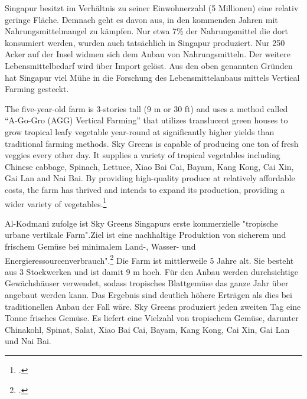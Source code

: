 \documentclass{scrartcl}
\begin{document}
Singapur besitzt im Verhältnis zu seiner Einwohnerzahl (5 Millionen)  eine relativ geringe Fläche. Demnach geht es davon aus, in den kommenden Jahren mit Nahrungsmittelmangel zu kämpfen. 
Nur etwa 7\% der Nahrungsmittel die dort konsumiert werden, wurden auch tatsächlich in Singapur produziert. Nur 250 Acker auf der Insel widmen sich dem Anbau von Nahrungsmitteln. Der weitere Lebensmittelbedarf wird über Import gelöst. Aus den oben genannten Gründen hat Singapur viel Mühe in die Forschung des Lebensmittelanbaus mittels Vertical Farming gesteckt. 
\begin{displayquote}
The five-year-old farm is 3-stories tall (9 m or 30 ft) and uses a method called “A-Go-Gro (AGG) Vertical Farming” that utilizes translucent green houses to grow tropical leafy vegetable year-round at significantly higher yields than traditional farming methods. Sky Greens is capable of producing one ton of fresh veggies every other day. It supplies a variety of tropical vegetables including Chinese cabbage, Spinach, Lettuce, Xiao Bai Cai, Bayam, Kang Kong, Cai Xin, Gai Lan and Nai Bai. By providing high-quality produce at relatively affordable costs, the farm has thrived and intends to expand its production, providing a wider variety of vegetables.\footcite[S.15]{Al-Kodmany2018TheCity}
\end{displayquote}

Al-Kodmani zufolge ist Sky Greens Singapurs erste kommerzielle "tropische urbane vertikale Farm".Ziel ist eine nachhaltige Produktion von sicherem und frischem Gemüse bei minimalem Land-, Wasser- und Energieressourcenverbrauch".\footcite{SkyGreens} Die Farm ist mittlerweile 5 Jahre alt. Sie besteht aus  3 Stockwerken und ist damit 9 m hoch. Für den Anbau werden durchsichtige Gewächshäuser verwendet, sodass tropisches Blattgemüse das ganze Jahr über angebaut werden kann. Das Ergebnis sind deutlich höhere Erträgen als dies bei traditionellen Anbau der Fall wäre. Sky Greens produziert jeden zweiten Tag eine Tonne frisches Gemüse. Es liefert eine Vielzahl von tropischem Gemüse, darunter Chinakohl, Spinat, Salat, Xiao Bai Cai, Bayam, Kang Kong, Cai Xin, Gai Lan und Nai Bai. 
\end{document}
